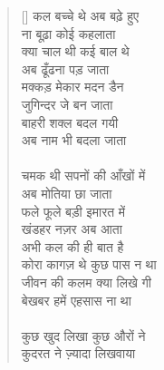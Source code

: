 \begin{verse}[\versewidth]\texthindi{
कल बच्चे थे अब बढ़े हुए\\
ना बूढ़ा कोई कहलाता\\
क्या चाल थी कई बाल थे\\
अब ढूँढना पड़ जाता\\
मक्कड़ मेकार मदन डैन\\
जुगिन्दर जे बन जाता\\
बाहरी शक्ल बदल गयी\\
अब नाम भी बदला जाता\\
\\
चमक थी सपनों की आँखों में\\
अब मोतिया छा जाता\\
फले फूले बड़ी इमारत में\\
खंडहर नज़र अब आता\\
अभी कल की ही बात है\\
कोरा कागज़ थे कुछ पास न था\\
जीवन की कलम क्या लिखे गी\\
बेखबर हमें एहसास ना था\\
\\
कुछ खुद लिखा कुछ औरों ने\\
कुदरत ने ज़्यादा लिखवाया
}\end{verse}

